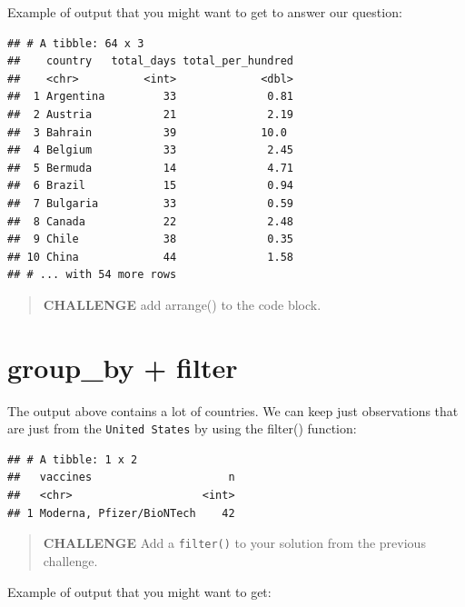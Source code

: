\documentclass[
]{book}
\newenvironment{Shaded}{\begin{snugshade}}{\end{snugshade}}
\newcommand{\KeywordTok}[1]{\textcolor[rgb]{0.13,0.29,0.53}{\textbf{#1}}}
\newcommand{\NormalTok}[1]{#1}
\newcommand{\OperatorTok}[1]{\textcolor[rgb]{0.81,0.36,0.00}{\textbf{#1}}}
\newcommand{\StringTok}[1]{\textcolor[rgb]{0.31,0.60,0.02}{#1}}
\begin{document}
Example of output that you might want to get to answer our question:

\begin{verbatim}
## # A tibble: 64 x 3
##    country   total_days total_per_hundred
##    <chr>          <int>             <dbl>
##  1 Argentina         33              0.81
##  2 Austria           21              2.19
##  3 Bahrain           39             10.0 
##  4 Belgium           33              2.45
##  5 Bermuda           14              4.71
##  6 Brazil            15              0.94
##  7 Bulgaria          33              0.59
##  8 Canada            22              2.48
##  9 Chile             38              0.35
## 10 China             44              1.58
## # ... with 54 more rows
\end{verbatim}

\begin{quote}
\textbf{CHALLENGE} add arrange() to the code block.
\end{quote}

\hypertarget{group_by-filter}{%
\section{group\_by + filter}\label{group_by-filter}}

The output above contains a lot of countries. We can keep just observations that are just from the \texttt{United\ States} by using the filter() function:

\begin{Shaded}
\end{Shaded}

\begin{verbatim}
## # A tibble: 1 x 2
##   vaccines                     n
##   <chr>                    <int>
## 1 Moderna, Pfizer/BioNTech    42
\end{verbatim}

\begin{quote}
\textbf{CHALLENGE} Add a \texttt{filter()} to your solution from the previous challenge.
\end{quote}

Example of output that you might want to get:
\end{document}

